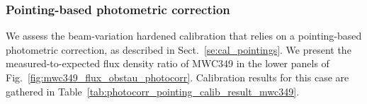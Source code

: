 %
%
%
\subsubsection{Pointing-based photometric correction}


We assess the beam-variation hardened calibration that relies on a
pointing-based photometric correction, as described in Sect.~\ref{se:cal_pointings}.
We present the measured-to-expected flux density ratio of MWC349 in
the lower panels of 
Fig.~\ref{fig:mwc349_flux_obstau_photocorr}. Calibration results
for this case are gathered in Table~\ref{tab:photocorr_pointing_calib_result_mwc349}.





